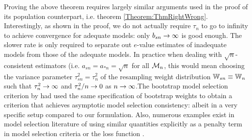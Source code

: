 Proving the above theorem requires largely similar arguments used in the proof of its population counterpart, i.e. theorem \ref{Theorem:ThmRightWrong}. Interestingly, as shown in the proof, we do not actually require $\tau_n$ to go to infinity to achieve convergence for adequate models: only $b_{s n} \rightarrow \infty$ is good enough. The slower rate is only required to separate out $e$-value estimates of inadequate models from those of the adequate models. In practice when dealing with $\sqrt n$-consistent estimators (i.e. $a_{s n} = a_{* n} = \sqrt n$ for all ${\cal{M}}_n$, this would mean choosing the variance parameter $\tau_{s n}^2 = \tau_n^2$ of the resampling weight distribution ${\mathbb{W}}_{s n} \equiv {\mathbb{W}}_n$ such that $\tau_n^2 \rightarrow \infty$ and $\tau_n^2/n \rightarrow 0$ as $n \rightarrow \infty$.The bootstrap model selection criterion by \cite{shao96} had used the same specification of bootstrap weights to obtain a criterion that achieves asymptotic model selection consistency: albeit in a very specific setup compared to our formulation. Also, numerous examples exist in model selection literature of using similar quantities explicitly as a penalty term in model selection criteria \citep{Schwarz78,KonishiKitagawa96} or the loss function \citep{Zou06}. %